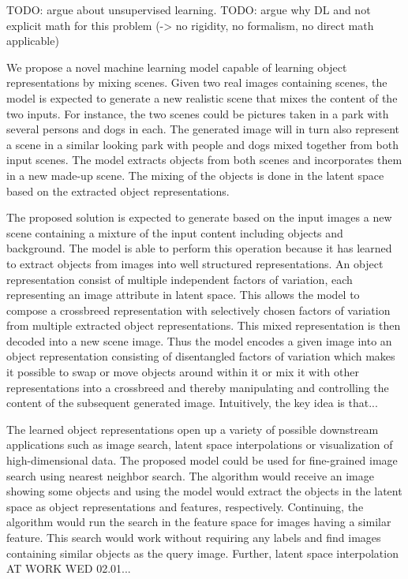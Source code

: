 \documentclass[11pt,a4paper]{article}
\begin{document}
TODO: argue about unsupervised learning.
TODO: argue why DL and not explicit math for this problem (-> no rigidity, no formalism, no direct math applicable)

We propose a novel machine learning model capable of learning object representations by mixing scenes. Given two real images containing scenes, the model is expected to generate a new realistic scene that mixes the content of the two inputs. For instance, the two scenes could be pictures taken in a park with several persons and dogs in each. The generated image will in turn also represent a scene in a similar looking park with people and dogs mixed together from both input scenes. The model extracts objects from both scenes and incorporates them in a new made-up scene. The mixing of the objects is done in the latent space based on the extracted object representations.

The proposed solution is expected to generate based on the input images a new scene containing a mixture of the input content including objects and background. The model is able to perform this operation because it has learned to extract objects from images into well structured representations. An object representation consist of multiple independent factors of variation, each representing an image attribute in latent space. This allows the model to compose a crossbreed representation with selectively chosen factors of variation from multiple extracted object representations. This mixed representation is then decoded into a new scene image. Thus the model encodes a given image into an object representation consisting of disentangled factors of variation which makes it possible to swap or move objects around within it or mix it with other representations into a crossbreed and thereby manipulating and controlling the content of the subsequent generated image. 
Intuitively, the key idea is that...

The learned object representations open up a variety of possible downstream applications such as image search, latent space interpolations or visualization of high-dimensional data. The proposed model could be used for fine-grained image search using nearest neighbor search. The algorithm would receive an image showing some objects and using the model would extract the objects in the latent space as object representations and features, respectively. Continuing, the algorithm would run the search in the feature space for images having a similar feature. This search would work without requiring any labels and find images containing similar objects as the query image. Further, latent space interpolation AT WORK WED 02.01...
\end{document}
